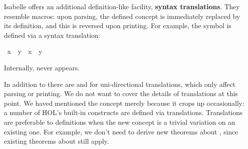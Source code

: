 %
\begin{isabellebody}%
\def\isabellecontext{Translations}%
%
%
\begin{isamarkuptext}%
\label{sec:def-translations}
Isabelle offers an additional definition-like facility,
\textbf{syntax translations}.
They resemble macros: upon parsing, the defined concept is immediately
replaced by its definition, and this is reversed upon printing. For example,
the symbol \isa{{\isasymnoteq}} is defined via a syntax translation:%
\end{isamarkuptext}%
\ {\isachardoublequote}x\ {\isasymnoteq}\ y{\isachardoublequote}\ {\isasymrightleftharpoons}\ {\isachardoublequote}{\isasymnot}{\isacharparenleft}x\ {\isacharequal}\ y{\isacharparenright}{\isachardoublequote}%
\begin{isamarkuptext}%
\noindent
Internally, \isa{{\isasymnoteq}} never appears.

In addition to \isa{{\isasymrightleftharpoons}} there are
\isa{{\isasymrightharpoonup}}
and \isa{{\isasymleftharpoondown}}
for uni-directional translations, which only affect
parsing or printing.  We do not want to cover the details of
translations at this point.  We haved mentioned the concept merely because it
crops up occasionally: a number of HOL's built-in constructs are defined
via translations.  Translations are preferable to definitions when the new 
concept is a trivial variation on an existing one.  For example, we
don't need to derive new theorems about \isa{{\isasymnoteq}}, since existing theorems
about \isa{{\isacharequal}} still apply.%
\end{isamarkuptext}%
\end{isabellebody}%
